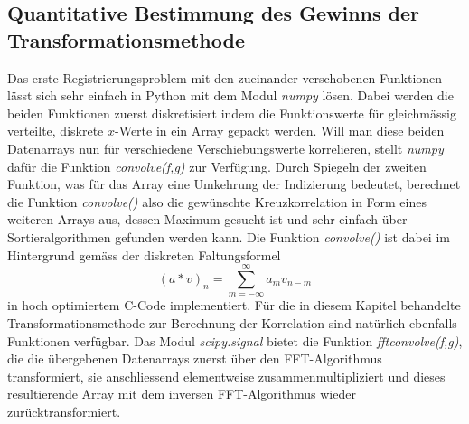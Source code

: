 \subsection{Quantitative Bestimmung des Gewinns der Transformationsmethode
\label{mellin:subsection:gewinn}}
Das erste Registrierungsproblem mit den zueinander verschobenen Funktionen 
lässt sich sehr einfach in Python mit dem Modul {\em numpy} lösen. 
Dabei werden die beiden Funktionen zuerst diskretisiert indem die Funktionswerte 
für gleichmässig verteilte, diskrete $x$-Werte in ein Array gepackt werden.
Will man diese beiden Datenarrays nun für verschiedene Verschiebungswerte 
korrelieren, stellt {\em numpy} dafür die Funktion {\em convolve(f,g)} zur 
Verfügung. 
Durch Spiegeln der zweiten Funktion, was für das Array eine Umkehrung der 
Indizierung bedeutet, berechnet die Funktion {\em convolve()} also die 
gewünschte Kreuzkorrelation in Form eines weiteren Arrays aus, dessen 
Maximum gesucht ist und sehr einfach über Sortieralgorithmen 
gefunden werden kann. 
Die Funktion {\em convolve()} ist dabei im Hintergrund gemäss der diskreten 
Faltungsformel
\[
    (a \ast v)_n = \sum_{m = -\infty}^{\infty} a_m v_{n-m}
\]
in hoch optimiertem C-Code implementiert.
Für die in diesem Kapitel behandelte Transformationsmethode zur Berechnung der 
Korrelation sind natürlich ebenfalls Funktionen verfügbar. 
Das Modul {\em scipy.signal} bietet die Funktion {\em fftconvolve(f,g)}, die die 
übergebenen Datenarrays zuerst über den FFT-Algorithmus 
transformiert, sie anschliessend elementweise zusammenmultipliziert und dieses 
resultierende Array mit dem inversen FFT-Algorithmus wieder zurücktransformiert.

